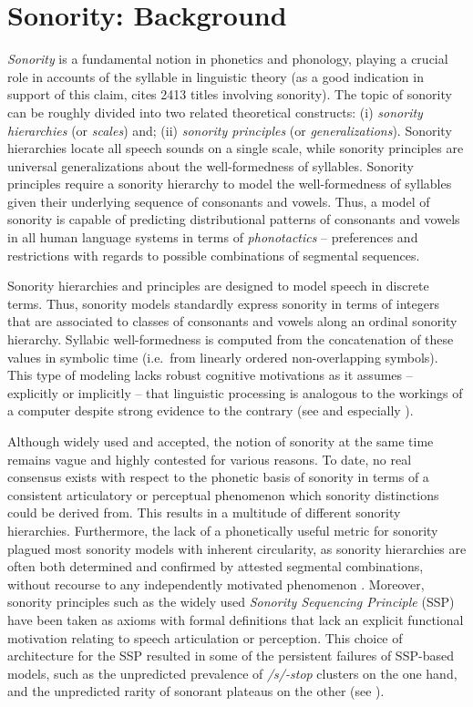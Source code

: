 
\chapter{Sonority: Background}\label{sec:background}

\emph{Sonority} is a fundamental notion in phonetics and phonology, playing a crucial role in accounts of the syllable in linguistic theory (as a good indication in support of this claim, \citealt{parker2018abib} cites 2413 titles involving sonority).
The topic of sonority can be roughly divided into two related theoretical constructs:
(i) \emph{sonority hierarchies} (or \emph{scales}) and;
(ii) \emph{sonority principles} (or \emph{generalizations}).
Sonority hierarchies locate all speech sounds on a single scale, while sonority principles are universal generalizations about the well-formedness of syllables. Sonority principles require a sonority hierarchy to model the well-formedness of syllables given their underlying sequence of consonants and vowels.
Thus, a model of sonority is capable of predicting distributional patterns of consonants and vowels in all human language systems in terms of \emph{phonotactics} -- preferences and restrictions with regards to possible combinations of segmental sequences.

Sonority hierarchies and principles are designed to model speech in discrete terms. Thus, sonority models standardly express sonority in terms of integers that are associated to classes of consonants and vowels along an ordinal sonority hierarchy. Syllabic well-formedness is computed from the concatenation of these values in symbolic time (i.e.~from linearly ordered non-overlapping symbols). This type of modeling lacks robust cognitive motivations as it assumes -- explicitly or implicitly -- that linguistic processing is analogous to the workings of a computer despite strong evidence to the contrary (see  and especially ).

Although widely used and accepted, the notion of sonority at the same time remains vague and highly contested for various reasons. To date, no real consensus exists with respect to the phonetic basis of sonority in terms of a consistent articulatory or perceptual phenomenon
which sonority distinctions could be derived from.
This results in a
multitude of different sonority hierarchies. Furthermore, the lack of a phonetically useful metric for sonority plagued most sonority models with inherent circularity, as sonority hierarchies are often both determined and confirmed by attested segmental combinations, without recourse to any independently motivated phenomenon \citep{ohala1992alternatives}.
Moreover, sonority principles such as the widely used \emph{Sonority Sequencing Principle} (SSP) have been taken as axioms with formal definitions that lack an explicit functional motivation relating to speech articulation or perception.
This choice of architecture for the SSP resulted in some of the persistent failures of SSP-based models, such as the unpredicted prevalence of \emph{/s/-stop} clusters on the one hand, and the unpredicted rarity of sonorant plateaus on the other (see ).


